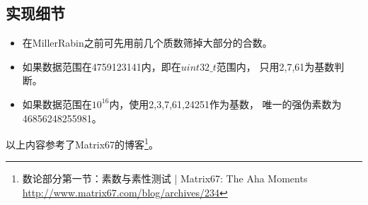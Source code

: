 \subsection{实现细节}
\begin{itemize}
    \item 在MillerRabin之前可先用前几个质数筛掉大部分的合数。
    \item 如果数据范围在4759123141内，即在$uint32\_t$范围内，
    只用2,7,61为基数判断。
    \item 如果数据范围在$10^{16}$内，使用2,3,7,61,24251作为基数，
    唯一的强伪素数为46856248255981。
\end{itemize}

以上内容参考了Matrix67的博客\footnote{
	数论部分第一节：素数与素性测试 | Matrix67: The Aha Moments
	\url{http://www.matrix67.com/blog/archives/234}}。
